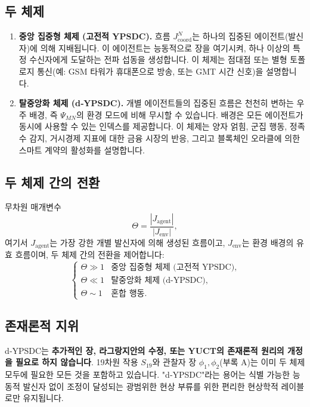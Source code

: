 \documentclass[11pt,a4paper]{article}
\begin{document}
	\subsection{두 체제}
	\begin{enumerate}[leftmargin=*, label=\textbf{(\arabic*)}]
		\item \textbf{중앙 집중형 체제 (고전적 YPSDC).} 흐름 \(J^{N}_{\mathrm{coord}}\)는 하나의 집중된 에이전트(발신자)에 의해 지배됩니다. 이 에이전트는 능동적으로 장을 여기시켜, 하나 이상의 특정 수신자에게 도달하는 전파 섭동을 생성합니다. 이 체제는 점대점 또는 별형 토폴로지 통신(예: GSM 타워가 휴대폰으로 방송, 또는 GMT 시간 신호)을 설명합니다.
		
		\item \textbf{탈중앙화 체제 (d‑YPSDC).} 개별 에이전트들의 집중된 흐름은 천천히 변하는 우주 배경, 즉 \(\Psi_{MN}\)의 환경 모드에 비해 무시할 수 있습니다. 배경은 모든 에이전트가 동시에 사용할 수 있는 인덱스를 제공합니다. 이 체제는 양자 얽힘, 군집 행동, 정족수 감지, 거시경제 지표에 대한 금융 시장의 반응, 그리고 블록체인 오라클에 의한 스마트 계약의 활성화를 설명합니다.
	\end{enumerate}
	
	\subsection{두 체제 간의 전환}
	무차원 매개변수
	\[
	\Theta = \frac{|J_{\mathrm{agent}}|}{|J_{\mathrm{env}}|},
	\]
	여기서 \(J_{\mathrm{agent}}\)는 가장 강한 개별 발신자에 의해 생성된 흐름이고, \(J_{\mathrm{env}}\)는 환경 배경의 유효 흐름이며, 두 체제 간의 전환을 제어합니다:
	\[
	\begin{cases}
		\Theta \gg 1 & \text{중앙 집중형 체제 (고전적 YPSDC)}, \\
		\Theta \ll 1 & \text{탈중앙화 체제 (d‑YPSDC)}, \\
		\Theta \sim 1 & \text{혼합 행동}.
	\end{cases}
	\]
	
	\subsection{존재론적 지위}
	d‑YPSDC는 \textbf{추가적인 장, 라그랑지안의 수정, 또는 YUCT의 존재론적 원리의 개정을 필요로 하지 않습니다}. 19차원 작용 \(S_{19}\)와 관찰자 장 \(\phi_1,\phi_2\)(부록 A)는 이미 두 체제 모두에 필요한 모든 것을 포함하고 있습니다. "d‑YPSDC"라는 용어는 식별 가능한 능동적 발신자 없이 조정이 달성되는 광범위한 현상 부류를 위한 편리한 현상학적 레이블로만 유지됩니다.
	
\end{document}

